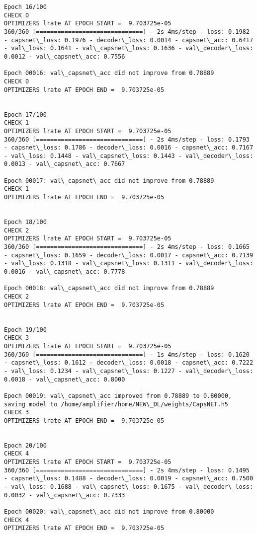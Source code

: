 \documentclass[11pt]{article}
\begin{document}
\begin{Verbatim}[commandchars=\\\{\}]
Epoch 16/100
CHECK 0
OPTIMIZERS lrate AT EPOCH START =  9.703725e-05
360/360 [==============================] - 2s 4ms/step - loss: 0.1982 - capsnet\_loss: 0.1976 - decoder\_loss: 0.0014 - capsnet\_acc: 0.6417 - val\_loss: 0.1641 - val\_capsnet\_loss: 0.1636 - val\_decoder\_loss: 0.0012 - val\_capsnet\_acc: 0.7556

Epoch 00016: val\_capsnet\_acc did not improve from 0.78889
CHECK 0
OPTIMIZERS lrate AT EPOCH END =  9.703725e-05 


Epoch 17/100
CHECK 1
OPTIMIZERS lrate AT EPOCH START =  9.703725e-05
360/360 [==============================] - 2s 4ms/step - loss: 0.1793 - capsnet\_loss: 0.1786 - decoder\_loss: 0.0016 - capsnet\_acc: 0.7167 - val\_loss: 0.1448 - val\_capsnet\_loss: 0.1443 - val\_decoder\_loss: 0.0013 - val\_capsnet\_acc: 0.7667

Epoch 00017: val\_capsnet\_acc did not improve from 0.78889
CHECK 1
OPTIMIZERS lrate AT EPOCH END =  9.703725e-05 


Epoch 18/100
CHECK 2
OPTIMIZERS lrate AT EPOCH START =  9.703725e-05
360/360 [==============================] - 2s 4ms/step - loss: 0.1665 - capsnet\_loss: 0.1659 - decoder\_loss: 0.0017 - capsnet\_acc: 0.7139 - val\_loss: 0.1318 - val\_capsnet\_loss: 0.1311 - val\_decoder\_loss: 0.0016 - val\_capsnet\_acc: 0.7778

Epoch 00018: val\_capsnet\_acc did not improve from 0.78889
CHECK 2
OPTIMIZERS lrate AT EPOCH END =  9.703725e-05 


Epoch 19/100
CHECK 3
OPTIMIZERS lrate AT EPOCH START =  9.703725e-05
360/360 [==============================] - 1s 4ms/step - loss: 0.1620 - capsnet\_loss: 0.1612 - decoder\_loss: 0.0018 - capsnet\_acc: 0.7222 - val\_loss: 0.1234 - val\_capsnet\_loss: 0.1227 - val\_decoder\_loss: 0.0018 - val\_capsnet\_acc: 0.8000

Epoch 00019: val\_capsnet\_acc improved from 0.78889 to 0.80000, saving model to /home/amplifier/home/NEW\_DL/weights/CapsNET.h5
CHECK 3
OPTIMIZERS lrate AT EPOCH END =  9.703725e-05 


Epoch 20/100
CHECK 4
OPTIMIZERS lrate AT EPOCH START =  9.703725e-05
360/360 [==============================] - 2s 4ms/step - loss: 0.1495 - capsnet\_loss: 0.1488 - decoder\_loss: 0.0019 - capsnet\_acc: 0.7500 - val\_loss: 0.1688 - val\_capsnet\_loss: 0.1675 - val\_decoder\_loss: 0.0032 - val\_capsnet\_acc: 0.7333

Epoch 00020: val\_capsnet\_acc did not improve from 0.80000
CHECK 4
OPTIMIZERS lrate AT EPOCH END =  9.703725e-05 



\end{Verbatim}
\end{document}
